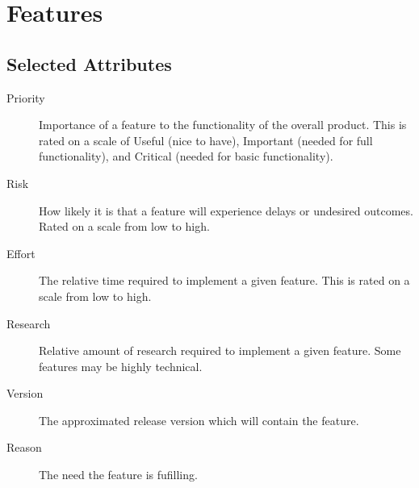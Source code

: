 \section{Features}

\subsection{Selected Attributes}
\begin{description}
	\item[Priority]{Importance of a feature to the functionality of the overall product.  This is rated on a scale of Useful (nice to have), Important (needed for full functionality), and Critical (needed for basic functionality).}
	\item[Risk]{How likely it is that a feature will experience delays or undesired outcomes. Rated on a scale from low to high.}
	\item[Effort]{The relative time required to implement a given feature.  This is rated on a scale from low to high.}
	\item[Research]{Relative amount of research required to implement a given feature. Some features may be highly technical.}
	\item[Version]{The approximated release version which will contain the feature.}
	\item[Reason]{The need the feature is fufilling.}
\end{description}

\newcommand{\lw}{Low}
\newcommand{\md}{Medium}
\newcommand{\hh}{High}
